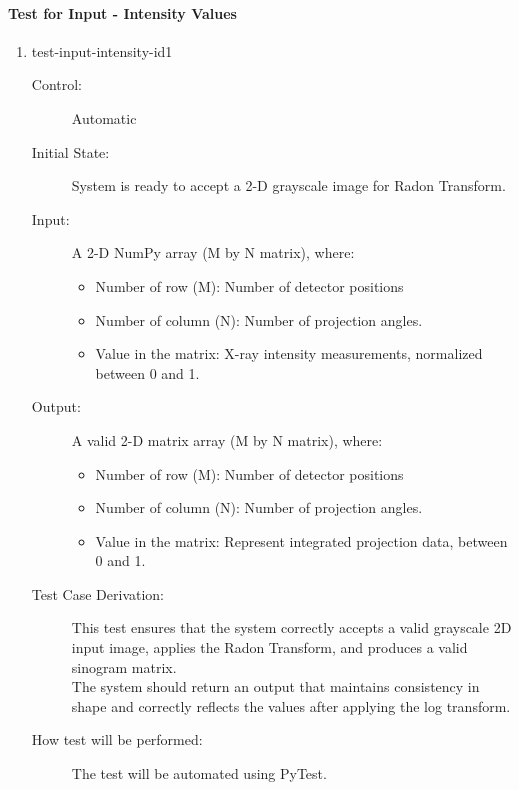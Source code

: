 \documentclass[12pt, titlepage]{article}
\begin{document}
\paragraph{Test for Input - Intensity Values}
\begin{enumerate}
\item{test-input-intensity-id1}
\begin{description}
\item[Control:] Automatic

\item[Initial State:] System is ready to accept a 2-D grayscale image for Radon Transform.

\item[Input:] A 2-D NumPy array (M by N matrix), where:
\begin{itemize}
    \item Number of row (M): Number of detector positions
    \item Number of column (N): Number of projection angles.
    \item Value in the matrix: X-ray intensity measurements, normalized between
      0 and 1.
\end{itemize}

\item[Output:] A valid 2-D matrix array (M by N matrix), where:
\begin{itemize}
    \item Number of row (M): Number of detector positions
    \item Number of column (N): Number of projection angles.
    \item Value in the matrix: Represent integrated projection data, between 0 and 1.
\end{itemize}

\item[Test Case Derivation:] This test ensures that the system correctly accepts a
valid grayscale 2D input image, applies the Radon Transform, and produces a
valid sinogram matrix. \\
The system should return an output that maintains consistency in shape and
correctly reflects the values after applying the log transform.

\item[How test will be performed:] The test will be automated using PyTest.
\end{description}
\end{enumerate}

\subsubsection{}
\end{document}
